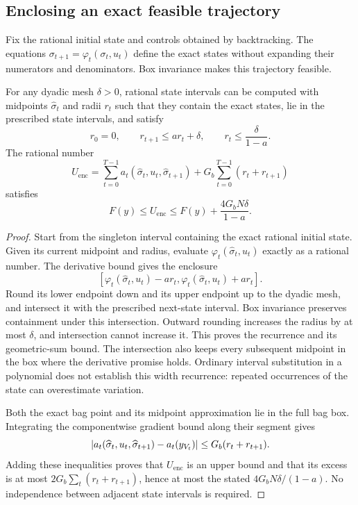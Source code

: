 \subsection{Enclosing an exact feasible trajectory}

Fix the rational initial state and controls obtained by backtracking.
The equations
$\sigma_{t+1}=\varphi_t(\sigma_t,u_t)$ define the exact states without
expanding their numerators and denominators.  Box invariance makes this
trajectory feasible.

\begin{lemma}
\label{lem:bit-enclosure}
For any dyadic mesh $\delta>0$, rational state intervals can be computed
with midpoints $\widehat\sigma_t$ and radii $r_t$ such that they contain
the exact states, lie in the prescribed state intervals, and satisfy
\begin{equation}
 r_0=0,\qquad r_{t+1}\le ar_t+\delta,
 \qquad r_t\le\frac{\delta}{1-a}.
 \label{eq:bit-enclosure-radius}
\end{equation}
The rational number
\begin{equation}
 U_{\mathrm{enc}}=\sum_{t=0}^{T-1}a_t(\widehat\sigma_t,u_t,\widehat\sigma_{t+1})
               +G_b\sum_{t=0}^{T-1}(r_t+r_{t+1})
 \label{eq:bit-objective-upper}
\end{equation}
satisfies
\[
 F(y)\le U_{\mathrm{enc}}\le F(y)+\frac{4G_bN\delta}{1-a}.
\]
\end{lemma}

\begin{proof}
Start from the singleton interval containing the exact rational initial
state.  Given its current midpoint and radius, evaluate
$\varphi_t(\widehat\sigma_t,u_t)$ exactly as a rational number.  The
derivative bound gives the enclosure
\[
 [\varphi_t(\widehat\sigma_t,u_t)-ar_t,
   \varphi_t(\widehat\sigma_t,u_t)+ar_t].
\]
Round its lower endpoint down and its upper endpoint up to the dyadic
mesh, and intersect it with the prescribed next-state interval.  Box
invariance preserves containment under this intersection.  Outward
rounding increases the radius by at most $\delta$, and intersection
cannot increase it.  This proves the recurrence and its geometric-sum
bound.  The intersection also keeps every subsequent midpoint in the
box where the derivative promise holds.  Ordinary interval substitution
in a polynomial does not establish this width recurrence: repeated
occurrences of the state can overestimate variation.

Both the exact bag point and its midpoint approximation lie in the full
bag box.  Integrating the componentwise gradient bound along their segment
gives
\[
 \left\lvert a_t(\widehat\sigma_t,u_t,\widehat\sigma_{t+1})-a_t(y_{V_t})\right\rvert
 \le G_b(r_t+r_{t+1}).
\]
Adding these inequalities proves that $U_{\mathrm{enc}}$ is an upper bound and that
its excess is at most $2G_b\sum_t(r_t+r_{t+1})$, hence at most the stated
$4G_bN\delta/(1-a)$.  No independence between adjacent state intervals
is required.
\end{proof}

